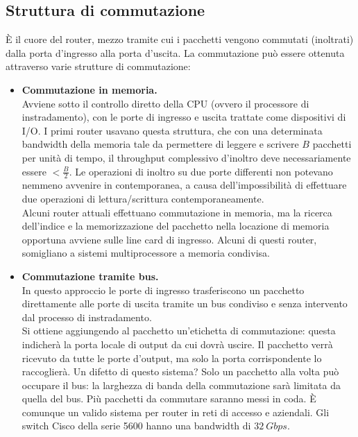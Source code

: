 \newpage

\subsection{Struttura di commutazione}
È il cuore del router, mezzo tramite cui i pacchetti vengono commutati (inoltrati) dalla porta d'ingresso alla porta d'uscita. La commutazione può essere ottenuta attraverso varie strutture di commutazione:
\begin{itemize}
	\item \textbf{Commutazione in memoria.}\\
	Avviene sotto il controllo diretto della CPU (ovvero il processore di instradamento), con le porte di ingresso e uscita trattate come dispositivi di I/O. I primi router usavano questa struttura, che con una determinata bandwidth della memoria tale da permettere di leggere e scrivere $B$ pacchetti per unità di tempo, il throughput complessivo d'inoltro deve necessariamente essere $< \frac{B}{2}$. Le operazioni di inoltro su due porte differenti non potevano nemmeno avvenire in contemporanea, a causa dell'impossibilità di effettuare due operazioni di lettura/scrittura contemporaneamente.\\
	Alcuni router attuali effettuano commutazione in memoria, ma la ricerca dell'indice e la memorizzazione del pacchetto nella locazione di memoria opportuna avviene sulle line card di ingresso. Alcuni di questi router, somigliano a sistemi multiprocessore a memoria condivisa.
	
	\item \textbf{Commutazione tramite bus.}\\
	In questo approccio le porte di ingresso trasferiscono un pacchetto direttamente alle porte di uscita tramite un bus condiviso e senza intervento dal processo di instradamento.\\
	Si ottiene aggiungendo al pacchetto un'etichetta di commutazione: questa indicherà la porta locale di output da cui dovrà uscire. Il pacchetto verrà ricevuto da tutte le porte d'output, ma solo la porta corrispondente lo raccoglierà. Un difetto di questo sistema? Solo un pacchetto alla volta può occupare il bus: la larghezza di banda della commutazione sarà limitata da quella del bus. Più pacchetti da commutare saranno messi in coda. È comunque un valido sistema per router in reti di accesso e aziendali. Gli switch Cisco della serie 5600 hanno una bandwidth di $32 \ Gbps$.
	

\end{itemize}
